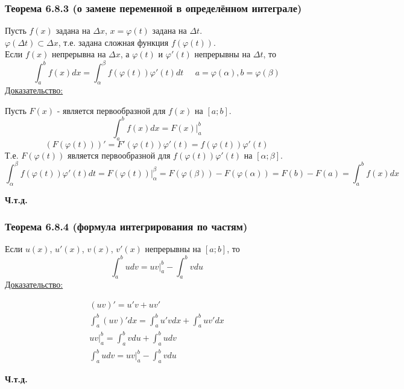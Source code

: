 \documentclass[12pt]{article}
\begin{document}
    \subsubsection*{Теорема 6.8.3 (о замене переменной в определённом интеграле)}\label{th:6.8.3}
    Пусть $f(x)$ задана на $\Delta x$, $x=\varphi(t)$ задана на $\Delta t$.\\
    $\varphi(\Delta t) \subset \Delta x$, т.е. задана сложная функция $f(\varphi(t))$.\\ Если $f(x)$ непрерывна на $\Delta x$, а $\varphi(t)$ и $\varphi'(t)$ непрерывны на $\Delta t$, то 
    \[ \int_{a}^{b}f(x)dx=\int_{\alpha}^{\beta}f(\varphi(t))\varphi'(t)dt \;\;\;\;\; a=\varphi(\alpha), b=\varphi(\beta) \]\noindent
    \underline{Доказательство:}
    \begin{adjustwidth}{1.5em}{1.5em}
        Пусть $F(x)$ - является первообразной для $f(x)$ на $[a;b]$.
        \[ \int_{a}^{b} f(x)dx=F(x)\Big|^{b}_{a} \]
        \[ (F(\varphi(t)))'=F'(\varphi(t))\varphi'(t)=f(\varphi (t))\varphi'(t) \]
        Т.е. $F(\varphi(t))$ является первообразной для $f(\varphi(t))\varphi'(t) $ на $[\alpha; \beta]$.
        \[ \int_{\alpha}^{\beta}f(\varphi(t))\varphi'(t)dt=F(\varphi(t))\Big|^{\beta}_{\alpha}=F(\varphi(\beta))-F(\varphi(\alpha))=F(b)-F(a)=\int_{a}^{b}f(x)dx \]
        \begin{center}
            \textbf{Ч.т.д.}
        \end{center}
    \end{adjustwidth}
    \subsubsection*{Теорема 6.8.4 (формула интегрирования по частям)}\label{th:6.8.4}
    Если $u(x)$, $u'(x)$, $v(x)$, $v'(x)$ непрерывны на $[a;b]$, то 
    \[ \int_{a}^{b} udv = uv \Big|^b_a-\int_{a}^{b}vdu \]\noindent
    \underline{Доказательство:}
    \begin{adjustwidth}{1.5em}{1.5em}
        \begin{gather*}
            (uv)'=u'v+uv'\\
            \int_{a}^{b} (uv)'dx=\int_{a}^{b} u'v dx+\int_{a}^{b}uv'dx\\
            uv \Big|^b_a=\int_{a}^{b}vdu + \int_{a}^{b} udv\\
            \int_{a}^{b}udv=uv\Big|^b_a-\int_{a}^{b} vdu
        \end{gather*}
        \begin{center}
            \textbf{Ч.т.д.}
        \end{center}
    \end{adjustwidth}
\end{document}

